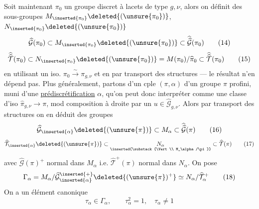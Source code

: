 Soit maintenant $\pi_0$ un groupe discret à lacets de type $g,\nu$, alors on définit des sous-groupes $M_{\inserted{\pi_0}}\deleted{(\unsure{\pi_0})}$, $N_{\inserted{\pi_0}}\deleted{(\unsure{\pi_0})}$
\[
\widehat{\mathcal G}(\pi_0)\subset M_{\inserted{\pi_0}}\deleted{(\unsure{\pi_0})}\subset\widehat{\widehat{\mathcal G}}(\pi_0)
\tag{14}
\]
\[
\widehat{\widehat{\mathcal T}}(\pi_0)\subset N_{\inserted{\pi_0}}\deleted{(\unsure{\pi_0})}=M(\pi_0)/\widehat{\pi}_0\subset\widehat{\widehat{\mathcal T}}(\pi_0)
\tag{15}
\]
en utilisant un iso. $\pi_0\overset{\sim}{\longrightarrow}\pi_{g,\nu}$ et en  par transport des structures --- le résultat n'en dépend pas. Plus généralement, partons d'un cple $(\pi,\alpha)$ d'un groupe $\pi$ profini, muni d'une \uline{prédiscrétification} $\alpha$, qu'on peut donc interpréter comme une classe d'iso $\widehat{\pi}_{g,\nu}\longrightarrow\pi$,  mod composition à droite par un $u\in\widehat{\mathcal G}_{g,\nu}$. Alors par transport des structures on en déduit des groupes 
\[
\widehat{\mathcal G}_{\inserted{\alpha}}\deleted{(\unsure{\pi})}\subset M_\alpha\subset\widehat{\widehat{\mathcal G}}(\pi)
\tag{16}
\]
\[
\widehat{\mathcal T}_{\inserted{\alpha}}\deleted{(\unsure{\pi})}\subset
\underset{\inserted{\substack{\Vert\\ M_\alpha/\pi}}}{N_\alpha}
\subset\widehat{\mathcal T}(\pi)
\tag{17}
\]
avec $\widehat{\mathcal G}(\pi)^{+}$ normal dans $M_\alpha$ i.e. $\widehat{\mathcal T}^{+}(\pi)$ normal dans $N_\alpha$. On pose
\[
\Gamma_\alpha=M_\alpha/\widehat{\mathcal G}_{\inserted{\alpha}}^{\inserted{+}}\deleted{(\unsure{\pi})^{+}}\simeq N_\alpha/\widehat{\mathcal T}_\alpha^{+}
\tag{18}
\]
On a un élément canonique 
\[
\tau_\alpha\in\Gamma_\alpha,\qquad \tau_\alpha^2=1,\quad\tau_\alpha\ne1
\tag{19}
\]



